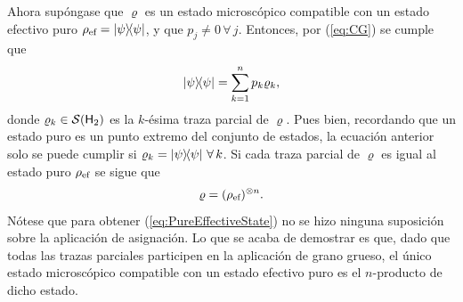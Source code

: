 Ahora supóngase que $\varrho$ es un estado microscópico compatible con un estado efectivo puro $\rho_{\ef}=\dyad{\psi}$, y que $p_{j}\neq 0\,\forall\,j$. Entonces, por (\ref{eq:CG}) se cumple que
\begin{equation}
    \dyad{\psi}=\sum_{k=1}^{n}p_{k}\varrho_{k},\nonumber
\end{equation}
donde $\varrho_{k}\in\mathcal{S}({\sf H}_{2})$ es la $k$-ésima traza parcial de $\varrho$. Pues bien, recordando que un estado puro es un punto extremo del conjunto de estados, la ecuación anterior solo se puede cumplir si $\varrho_{k}=\dyad{\psi}\,\forall\,k$.  Si cada traza parcial de $\varrho$ es igual al estado puro $\rho_{\text{ef}}$ se sigue que
\begin{equation}\label{eq:PureEffectiveState}
    \varrho=(\rho_{\text{ef}})^{\otimes n}.
\end{equation}
Nótese que para obtener (\ref{eq:PureEffectiveState}) no se hizo ninguna suposición sobre la aplicación de asignación. Lo que se acaba de demostrar es que, dado que todas las trazas parciales participen en la aplicación de grano grueso, el único estado microscópico compatible con un estado efectivo puro es el $n$-producto de dicho estado.
